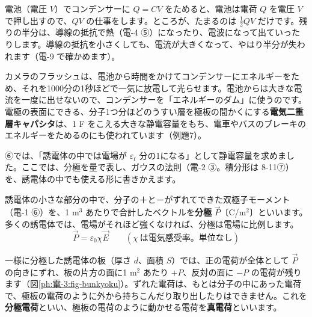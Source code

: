 電池（電圧 $V$）でコンデンサーに $Q=CV$ をためると、電池は電荷 $Q$ を電圧 $V$ で押し出すので、$QV$ の仕事をします。ところが、たまるのは $\tfrac12QV$ だけです。残りの半分は、導線の抵抗で熱（電-4 ⑤）になったり、電波になって出ていったりします。導線の抵抗を小さくしても、電流が大きくなって、やはり半分が失われます（電-9 で確かめます）。

\begin{phmijika}
カメラのフラッシュは、電池から時間をかけてコンデンサーにエネルギーをため、それを1000分の1秒ほどで一気に放電して光らせます。電池からは大きな電流を一度に出せないので、コンデンサーを「エネルギーのダム」に使うのです。電極の表面にできる、分子1つ分ほどのうすい層を極板の間かくにする\textbf{電気二重層キャパシタ}は、1 F をこえる大きな静電容量をもち、電車やバスのブレーキのエネルギーをためるのにも使われています（例題7）。
\end{phmijika}

\begin{phmodel}[コンデンサー]
\end{phmodel}

\phkokomade


\label{ph:電-3:sec8}
⑥では、「誘電体の中では電場が $\varepsilon_{\mathrm r}$ 分の1になる」として静電容量を求めました。ここでは、分極を量で表し、ガウスの法則（電-2 ③。積分形は 8-11⑦）を、誘電体の中でも使える形に書きかえます。

誘電体の小さな部分の中で、分子の＋と－がずれてできた双極子モーメント（電-1 ⑥）を、1 m$^3$ あたりで合計したベクトルを\textbf{分極} $\vec P$〔C/m$^2$〕といいます。多くの誘電体では、電場がそれほど強くなければ、分極は電場に比例します。
\[\vec P=\varepsilon_0\chi\vec E\qquad(\chi\ \text{は電気感受率。単位なし})\]

一様に分極した誘電体の板（厚さ $d$、面積 $S$）では、正の電荷が全体として $\vec P$ の向きにずれ、板の片方の面に1 m$^2$ あたり $+P$、反対の面に $-P$ の電荷が残ります（図\ref{ph:電-3:fig-bunkyoku}）。ずれた電荷は、もとは分子の中にあった電荷で、極板の電荷のように外から持ちこんだり取り出したりはできません。これを\textbf{分極電荷}といい、極板の電荷のように動かせる電荷を\textbf{真電荷}といいます。

